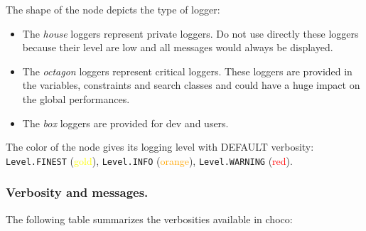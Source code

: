 
The shape of the node depicts the type of logger:
\begin{itemize}
	\item The \emph{house} loggers represent private loggers. Do not use directly these loggers because their level are low and all messages would always be displayed.
	\item The \emph{octagon} loggers represent critical loggers. These loggers are provided in the variables, constraints and search classes and could have a huge impact on the global performances.
	\item The \emph{box} loggers are provided for dev and users.
\end{itemize}
The color of the node gives its logging level with DEFAULT verbosity:
\texttt{Level.FINEST} (\textcolor{yellow}{gold}),
\texttt{Level.INFO} (\textcolor{orange}{orange}),
\texttt{Level.WARNING} (\textcolor{red}{red}).

\subsubsection{Verbosity and messages.}\label{advanced:verbosityandmessages}\hypertarget{advanced:verbosityandmessages}{}
The following table summarizes the verbosities available in choco: 

